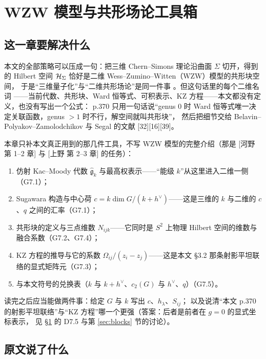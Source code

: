 \section{WZW 模型与共形场论工具箱}\label{sec:wzw}

\subsection{这一章要解决什么}

本文的全部策略可以压成一句：把三维 Chern--Simons 理论沿曲面 $\Sigma$ 切开，得到的
Hilbert 空间 $\mathcal{H}_\Sigma$ 恰好是二维 Wess--Zumino--Witten（WZW）模型的共形块空间，
于是“三维量子化”与“二维共形场论”是同一件事 。但这句话里的每个二维名词
——当前代数、共形块、Ward 恒等式、可积表示、KZ 方程——本文都没有定义，也没有写出一个公式：
p.370 只用一句话说“genus $0$ 时 Ward 恒等式唯一决定关联函数，genus $>1$ 时不行，解空间就叫共形块”，
然后把细节交给 Belavin--Polyakov--Zamolodchikov 与 Segal 的文献 [32][16][39]。

本章只补本文真正用到的那几件工具，不写 WZW 模型的完整介绍（那是
[河野 第 1--2 章] 与 [上野 第 2--3 章] 的任务）：
\begin{enumerate}[leftmargin=2em]
\item 仿射 Kac--Moody 代数 $\widehat{\mathfrak g}_k$ 与最高权表示——“能级 $k$”从这里进入二维一侧（G7.1）；
\item Sugawara 构造与中心荷 $c=k\dim G/(k+h^\vee)$——这是三维的 $k$ 与二维的 $c$、$q$ 之间的汇率（G7.1）；
\item 共形块的定义与三点维数 $N_{ijk}$——它同时是 $S^2$ 上物理 Hilbert 空间的维数与融合系数（G7.2、G7.4）；
\item KZ 方程的推导与它的系数 $\Omega_{ij}/(z_i-z_j)$——这是本文 \S3.2 那条射影平坦联络的显式矩阵元（G7.3）；
\item 与本文符号的兑换表（$k$ 与 $k+h^\vee$、$c_2(G)$ 与 $h^\vee$、$q$）（G7.5）。
\end{enumerate}

读完之后应当能做两件事：给定 $G$ 与 $k$ 写出 $c$、$h_\lambda$、$S_{ij}$；
以及说清“本文 p.370 的射影平坦联络”与“KZ 方程”哪一个更强（答案：后者是前者在 $g=0$ 的显式坐标表示，
见 \S\ref{sec:wzw} 的 D7.5 与第 \ref{sec:blocks} 节的讨论）。

\subsection{原文说了什么}

